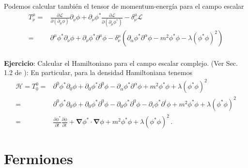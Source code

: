 \begin{frame}
Podemos calcular también el tensor de momentum-energía para el campo escalar
\begin{align}
  T^\mu_\nu=&\frac{\partial\mathcal{L}}{\partial\left(\partial_\mu\phi\right)} \partial_\nu \phi + \partial_\nu \phi^* \frac{\partial\mathcal{L}}{\partial\left(\partial_\mu\phi^*\right)}-\delta_\nu^\mu \mathcal{L} \nonumber\\
   =&\partial^\mu\phi^* \partial_\nu \phi + \partial_\nu \phi^* \partial^\mu\phi-\delta_\nu^\mu \left(\partial_{\alpha}\phi^{*} \partial^{\alpha}\phi-m^2\phi^{*}\phi-\lambda \left(\phi^{*}\phi \right)^2\right)\nonumber\\
\end{align}

\textbf{Ejercicio}: Calcular el Hamiltoniano para el campo escalar complejo. (Ver Sec. 1.2 de \cite{Greiner:1990tz}):
En particular, para la densidad Hamiltoniana tenemos
\begin{align}
 \mathcal{H}=  T^0_0 =&\partial^0\phi^* \partial_0 \phi + \partial_0 \phi^* \partial^0\phi-\partial_{\alpha}\phi^{*} \partial^{\alpha}\phi+m^2\phi^{*}\phi+\lambda \left(\phi^{*}\phi \right)^2 \nonumber\\
  =&\partial^0\phi^* \partial_0 \phi + \partial_0 \phi^* \partial^0\phi-\partial_{0}\phi^{*} \partial^{0}\phi-\partial_{i}\phi^{*} \partial^i\phi+m^2\phi^{*}\phi+\lambda \left(\phi^{*}\phi \right)^2 \nonumber\\
  =&\frac{\partial\phi^*}{\partial t} \frac{\partial\phi}{\partial t}  +\boldsymbol{\nabla}\phi^{*}\cdot\boldsymbol{\nabla}\phi+m^2\phi^{*}\phi+\lambda \left(\phi^{*}\phi \right)^2 \,.
\end{align}

\end{frame}




\chapter{Fermiones}
\label{cha:fermiones} %

